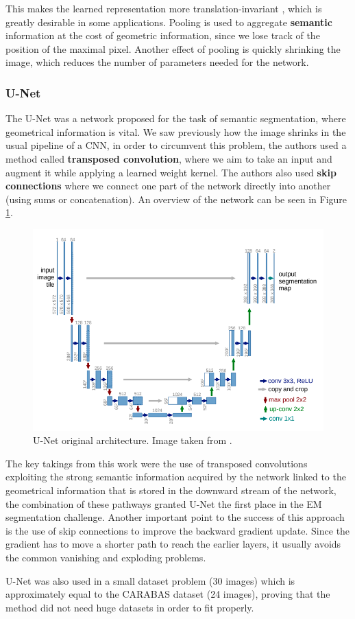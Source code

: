 This makes the learned representation more translation-invariant \cite{dlbook}, which is greatly desirable in some applications. Pooling is used to aggregate \textbf{semantic} information at the cost of geometric information, since we lose track of the position of the maximal pixel. Another effect of pooling is quickly shrinking the image, which reduces the number of parameters needed for the network.

\subsubsection{U-Net}

The U-Net \cite{unet_gordo} was a network proposed for the task of semantic segmentation, where geometrical information is vital. We saw previously how the image shrinks in the usual pipeline of a CNN, in order to circumvent this problem, the authors used a method called \textbf{transposed convolution}, where we aim to take an input and augment it while applying a learned weight kernel. The authors also used \textbf{skip connections} where we connect one part of the network directly into another (using sums or concatenation). An overview of the network can be seen in Figure \ref{unetimg}.

\begin{figure}[H]
    \includegraphics[width=.7\textwidth]{Cap2-Methods/screenshot_1.png}
    \centering
	\caption{U-Net original architecture. Image taken from \cite{unet_gordo}.}
	\label{unetimg}
\end{figure}

The key takings from this work were the use of transposed convolutions exploiting the strong semantic information acquired by the network linked to the geometrical information that is stored in the downward stream of the network, the combination of these pathways granted U-Net the first place in the EM segmentation challenge. Another important point to the success of this approach is the use of skip connections to improve the backward gradient update. Since the gradient has to move a shorter path to reach the earlier layers, it usually avoids the common vanishing and exploding problems.

U-Net was also used in a small dataset problem (30 images) which is approximately equal to the CARABAS dataset (24 images), proving that the method did not need huge datasets in order to fit properly.